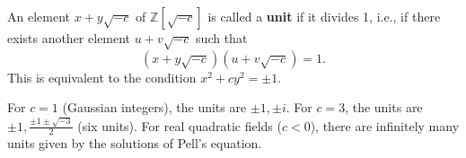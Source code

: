 An element $x + y\sqrt{-c}$ of $\mathbb{Z}[\sqrt{-c}]$ is called a \textbf{unit} if it divides 1, i.e., if there exists another element $u + v\sqrt{-c}$ such that
$$(x + y\sqrt{-c})(u + v\sqrt{-c}) = 1.$$
This is equivalent to the condition $x^2 + cy^2 = \pm 1$.

For $c=1$ (Gaussian integers), the units are $\pm 1, \pm i$. For $c=3$, the units are $\pm 1, \frac{\pm 1 \pm \sqrt{-3}}{2}$ (six units). For real quadratic fields ($c < 0$), there are infinitely many units given by the solutions of Pell's equation.
